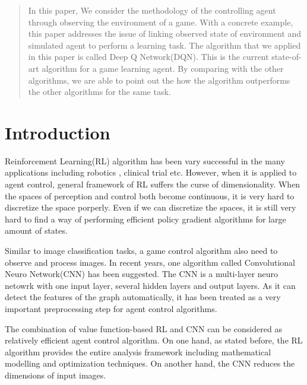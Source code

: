 \documentclass{article}
\begin{document}
 
\begin{abstract} 
In this paper, We consider the methodology of the controlling agent through observing the environment of a game. With a concrete example, this paper addresses the issue of linking observed state of environment and simulated agent to perform a learning task. The algorithm that we applied in this paper is called Deep Q Network(DQN). This is the current state-of-art algorithm for a game learning agent. By comparing with the other algorithms, we are able to point out the how the algorithm outperforms the other algorithms for the same task.
\end{abstract} 
\section*{Introduction}
Reinforcement Learning(RL) algorithm has been vary successful in the many applications including robotics \cite{kober2012reinforcement}, clinical trial \cite{kuleshov2010algorithms} etc. However, when it is applied to agent control, general framework of RL suffers the curse of dimensionality. When the spaces of perception and control both become continuous, it is very hard to discretize the space porperly. Even if we can discretize the spaces, it is still very hard to find a way of performing efficient policy gradient algorithms for large amount of states. 

Similar to image classification tasks, a game control algorithm also need to observe and process images. In recent years, one algorithm called Convolutional Neuro Network(CNN) has been suggested\cite{lecun1998gradient}. The CNN is a multi-layer neuro netowrk with one input layer, several hidden layers and output layers. As it can detect the features of the graph automatically, it has been treated as a very important preprocessing step for agent control algorithms.

The combination of value function-based RL and CNN can be considered as relatively efficient agent control algorithm. On one hand, as stated before, the RL algorithm provides the entire analysis framework including mathematical modelling and optimization techniques. On another hand, the CNN reduces the dimensions of input images. 
\end{document}
